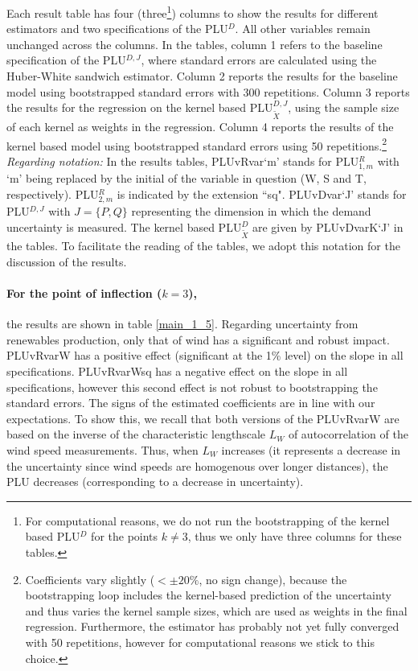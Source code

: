 Each result table has four (three\footnote{For computational reasons, we do not run the bootstrapping of the kernel based PLU$^D$ for the points $k\neq 3$, thus we only have three columns for these tables.}) columns to show the results for different estimators and two specifications of the PLU$^D$. All other variables remain unchanged across the columns. In the tables, column 1 refers to the baseline specification of the PLU$^{D,J}$, where standard errors are calculated using the Huber-White sandwich estimator. Column 2 reports the results for the baseline model using bootstrapped standard errors with 300 repetitions. Column 3 reports the results for the regression on the kernel based PLU$^{D,J}_{\tilde{X}}$, using the sample size of each kernel as weights in the regression. Column 4 reports the results of the kernel based model using bootstrapped standard errors using 50 repetitions.\footnote{Coefficients vary slightly ($<\pm20\%$, no sign change), because the bootstrapping loop includes the kernel-based prediction of the uncertainty and thus varies the kernel sample sizes, which are used as weights in the final regression. Furthermore, the estimator has probably not yet fully converged with 50 repetitions, however for computational reasons we stick to this choice.} \\

\emph{Regarding notation:  } In the results tables, PLUvRvar`m' stands for PLU$^R_{1,m}$ with `m' being replaced by the initial of the variable in question (W, S and T, respectively). PLU$^R_{2,m}$ is indicated by the extension ``sq".  PLUvDvar`J' stands for PLU$^{D,J}$ with $J=\{P,Q\}$ representing the dimension in which the demand uncertainty is measured. The kernel based PLU$^D_{\tilde{X}}$ are given by PLUvDvarK`J' in the tables. To facilitate the reading of the tables, we adopt this notation for the discussion of the results. 


\paragraph{For the point of inflection ($k=3$),}
the results are shown in table \ref{main_1_5}. Regarding uncertainty from renewables production, only that of wind has a significant and robust impact. PLUvRvarW has a positive effect (significant at the 1\% level) on the slope in all specifications. PLUvRvarWsq has a negative effect on the slope in all specifications, however this second effect is not robust to bootstrapping the standard errors. The signs of the estimated coefficients are in line with our expectations. To show this, we recall that both versions of the PLUvRvarW are based on the inverse of the characteristic lengthscale $L_W$ of autocorrelation of the wind speed measurements. Thus, when $L_W$ increases (it represents a decrease in the uncertainty since wind speeds are homogenous over longer distances), the PLU decreases (corresponding to a decrease in uncertainty). \\

